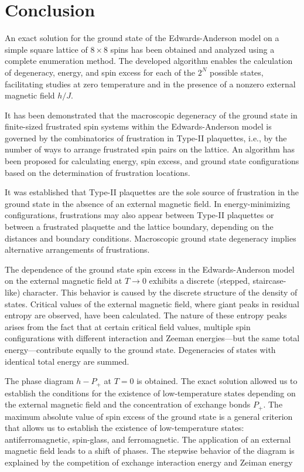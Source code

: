 \documentclass[preprint,12pt]{elsarticle}
\begin{document}
	\section{Conclusion}
	
	An exact solution for the ground state of the Edwards-Anderson model on a simple square lattice of $8 \times 8$ spins has been obtained and analyzed using a complete enumeration method. The developed algorithm enables the calculation of degeneracy, energy, and spin excess for each of the $2^N$ possible states, facilitating studies at zero temperature and in the presence of a nonzero external magnetic field $h/J$.
	
	It has been demonstrated that the macroscopic degeneracy of the ground state in finite-sized frustrated spin systems within the Edwards-Anderson model is governed by the combinatorics of frustration in  Type-II plaquettes, i.e., by the number of ways to arrange frustrated spin pairs on the lattice. An algorithm has been proposed for calculating energy, spin excess, and ground state configurations based on the determination of frustration locations.
	
	It was established that Type-II plaquettes are the sole source of frustration in the ground state in the absence of an external magnetic field. In energy-minimizing configurations, frustrations may also appear between Type-II plaquettes or between a frustrated plaquette and the lattice boundary, depending on the distances and boundary conditions. Macroscopic ground state degeneracy implies alternative arrangements of frustrations.
	
	The dependence of the ground state spin excess in the Edwards-Anderson model on the external magnetic field at $T \to 0$ exhibits a discrete (stepped, staircase-like) character. This behavior is caused by the discrete structure of the density of states. Critical values of the external magnetic field, where giant peaks in residual entropy are observed, have been calculated. The nature of these entropy peaks arises from the fact that at certain critical field values, multiple spin configurations with different interaction and Zeeman energies—but the same total energy—contribute equally to the ground state. Degeneracies of states with identical total energy are summed.
	
	The phase diagram $h - P_+$ at $T = 0$ is obtained. The exact solution allowed us to establish the conditions for the existence of low-temperature states depending on the external magnetic field and the concentration of exchange bonds $P_+$. The maximum absolute value of spin excess of the ground state is a general criterion that allows us to establish the existence of low-temperature states: antiferromagnetic, spin-glass, and ferromagnetic. The application of an external magnetic field leads to a shift of phases. The stepwise behavior of the diagram is explained by the competition of exchange interaction energy and Zeiman energy
	
\end{document}
